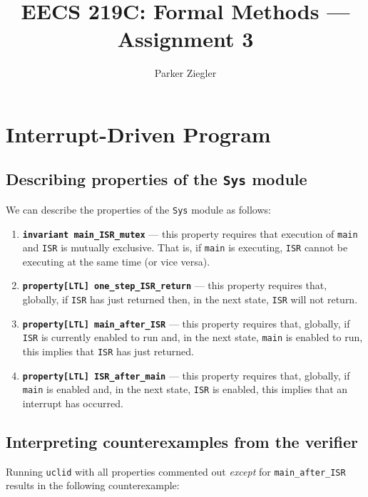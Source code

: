\documentclass{article}
\title{EECS 219C: Formal Methods — Assignment 3}
\author{Parker Ziegler}
\newcommand{\code}[1]{\texttt{#1}}
\begin{document}
\maketitle

\section{Interrupt-Driven Program}

\subsection{Describing properties of the \code{Sys} module}

We can describe the properties of the \code{Sys} module as follows:

\begin{enumerate}
  \item \textbf{\code{invariant main\_ISR\_mutex}} — this property requires that execution of \code{main} and \code{ISR} is mutually exclusive. That is, if \code{main} is executing, \code{ISR} cannot be executing at the same time (or vice versa).
  \item \textbf{\code{property[LTL] one\_step\_ISR\_return}} — this property requires that, globally, if \code{ISR} has just returned then, in the next state, \code{ISR} will not return.
  \item \textbf{\code{property[LTL] main\_after\_ISR}} — this property requires that, globally, if \code{ISR} is currently enabled to run and, in the next state, \code{main} is enabled to run, this implies that \code{ISR} has just returned.
  \item \textbf{\code{property[LTL] ISR\_after\_main}} — this property requires that, globally, if \code{main} is enabled and, in the next state, \code{ISR} is enabled, this implies that an interrupt has occurred.
\end{enumerate}

\subsection{Interpreting counterexamples from the verifier}

Running \code{uclid} with all properties commented out \emph{except} for \code{main\_after\_ISR} results in the following counterexample:
\end{document}
